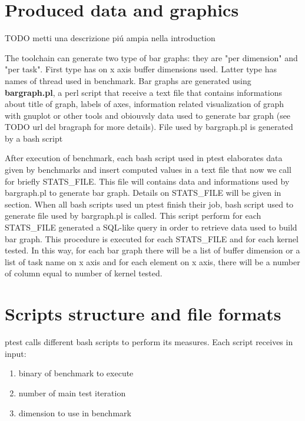 \documentclass[a4paper,10pt]{article}
\begin{document}
\begin{multicols}{2}
\section{Produced data and graphics}

TODO metti una descrizione pi\'u ampia nella introduction

The toolchain can generate two type of bar graphs: they are "per dimension" and "per task". First type has on x axis buffer dimensions used.
Latter type has names of thread used in benchmark. Bar graphs are generated using \textbf{bargraph.pl}, a perl script 
that receive a text file that contains informations about title of graph, labels of axes, information related visualization of graph with gnuplot or 
other tools and obiouvsly data used to generate bar graph (see TODO url del bragraph for more details). File used by bargraph.pl is generated by
a bash script 

After execution of benchmark, each bash script used in ptest elaborates data given by benchmarks and insert computed values in a text file that 
now we call for briefly STATS\_FILE. This file will contains data and informations used by bargraph.pl to generate bar graph. Details on 
STATS\_FILE will be given in section.
When all bash scripts used un ptest finish their job, bash script used to generate file used by bargraph.pl is called. This script  perform for each STATS\_FILE generated a SQL-like query in order to retrieve data used to build bar graph. This procedure is executed for each STATS\_FILE and 
for each kernel tested. In this way, for each bar graph there will be a list of buffer dimension or a list of task name on x axis and for each element 
on x axis, there will be a number of column equal to number of kernel tested.


\section{Scripts structure and file formats}

ptest calls different bash scripts to perform its measures. Each script receives in input:

\begin{enumerate}
	\item binary of benchmark to execute
	\item number of main test iteration
	\item dimension to use in benchmark
\end{enumerate}


\end{multicols}
\end{document}
